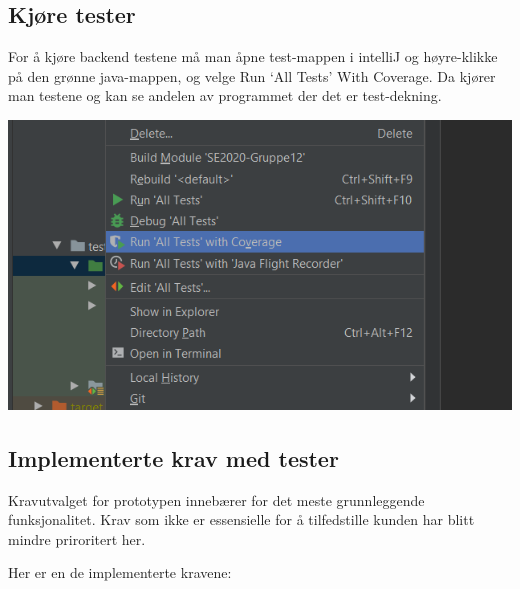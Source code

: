 \documentclass[12pt]{article}
\begin{document}
    \subsection{Kjøre tester}
    For å kjøre backend testene må man åpne test-mappen i intelliJ og høyre-klikke på den grønne java-mappen, og velge Run ‘All Tests’ With Coverage. Da kjører man testene og kan se andelen av programmet der det er test-dekning.

    \includegraphics[max width=\textwidth]{bilder/prototypen/testveiledning.png}

    \subsection{Implementerte krav med tester}
    Kravutvalget for prototypen innebærer for det meste grunnleggende funksjonalitet. Krav som ikke er essensielle for å tilfedstille kunden har blitt mindre priroritert her.
    
    Her er en de implementerte kravene:
\end{document}
